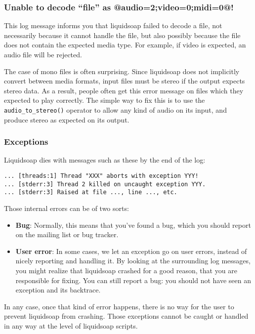 \subsubsection{Unable to decode ``file'' as @{audio=2;video=0;midi=0}@!}
This log message informs you that liquidsoap failed to decode a file, not
necessarily because it cannot handle the file, but also possibly because the
file does not contain the expected media type. For example, if video is
expected, an audio file will be rejected.

The case of mono files is often surprising. Since liquidsoap does not implicitly
convert between media formats, input files must be stereo if the output expects
stereo data. As a result, people often get this error message on files which
they expected to play correctly. The simple way to fix this is to use the
\verb+audio_to_stereo()+ operator to allow any kind of audio on its input, and
produce stereo as expected on its output.

\subsubsection{Exceptions}
Liquidsoap dies with messages such as these by the end of the log:

\begin{verbatim}
... [threads:1] Thread "XXX" aborts with exception YYY!
... [stderr:3] Thread 2 killed on uncaught exception YYY.
... [stderr:3] Raised at file ..., line ..., etc.
\end{verbatim}
Those internal errors can be of two sorts:

\begin{itemize}
\item \textbf{Bug}: Normally, this means that you've found a bug, which you
  should report on the mailing list or bug tracker.
\item \textbf{User error}: In some cases, we let an exception go on user errors,
  instead of nicely reporting and handling it. By looking at the surrounding log
  messages, you might realize that liquidsoap crashed for a good reason, that
  you are responsible for fixing. You can still report a bug: you should not
  have seen an exception and its backtrace.

\end{itemize}
In any case, once that kind of error happens, there is no way for the user to
prevent liquidsoap from crashing. Those exceptions cannot be caught or handled
in any way at the level of liquidsoap scripts.

